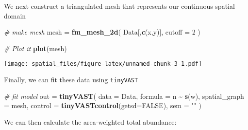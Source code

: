 \documentclass[
]{article}
\newenvironment{Shaded}{\begin{snugshade}}{\end{snugshade}}
\newcommand{\AttributeTok}[1]{\textcolor[rgb]{0.13,0.29,0.53}{#1}}
\newcommand{\CommentTok}[1]{\textcolor[rgb]{0.56,0.35,0.01}{\textit{#1}}}
\newcommand{\ConstantTok}[1]{\textcolor[rgb]{0.56,0.35,0.01}{#1}}
\newcommand{\DecValTok}[1]{\textcolor[rgb]{0.00,0.00,0.81}{#1}}
\newcommand{\FunctionTok}[1]{\textcolor[rgb]{0.13,0.29,0.53}{\textbf{#1}}}
\newcommand{\NormalTok}[1]{#1}
\newcommand{\OtherTok}[1]{\textcolor[rgb]{0.56,0.35,0.01}{#1}}
\newcommand{\SpecialCharTok}[1]{\textcolor[rgb]{0.81,0.36,0.00}{\textbf{#1}}}
\newcommand{\StringTok}[1]{\textcolor[rgb]{0.31,0.60,0.02}{#1}}
\begin{document}
We next construct a triangulated mesh that represents our continuous
spatial domain

\begin{Shaded}
\begin{Highlighting}[]
\CommentTok{\# make mesh}
\NormalTok{mesh }\OtherTok{=} \FunctionTok{fm\_mesh\_2d}\NormalTok{( Data[,}\FunctionTok{c}\NormalTok{(}\StringTok{\textquotesingle{}x\textquotesingle{}}\NormalTok{,}\StringTok{\textquotesingle{}y\textquotesingle{}}\NormalTok{)], }\AttributeTok{cutoff =} \DecValTok{2}\NormalTok{ )}

\CommentTok{\# Plot it}
\FunctionTok{plot}\NormalTok{(mesh)}
\end{Highlighting}
\end{Shaded}

\texttt{[image: spatial\_files/figure-latex/unnamed-chunk-3-1.pdf]}

Finally, we can fit these data using \texttt{tinyVAST}

\begin{Shaded}
\begin{Highlighting}[]
\CommentTok{\# fit model}
\NormalTok{out }\OtherTok{=} \FunctionTok{tinyVAST}\NormalTok{( }\AttributeTok{data =}\NormalTok{ Data,}
           \AttributeTok{formula =}\NormalTok{ n }\SpecialCharTok{\textasciitilde{}} \FunctionTok{s}\NormalTok{(w),}
           \AttributeTok{spatial\_graph =}\NormalTok{ mesh,}
           \AttributeTok{control =} \FunctionTok{tinyVASTcontrol}\NormalTok{(}\AttributeTok{getsd=}\ConstantTok{FALSE}\NormalTok{),}
           \AttributeTok{sem =} \StringTok{""}\NormalTok{ )}
\end{Highlighting}
\end{Shaded}

We can then calculate the area-weighted total abundance:

\begin{Shaded}
\end{Shaded}
\end{document}
